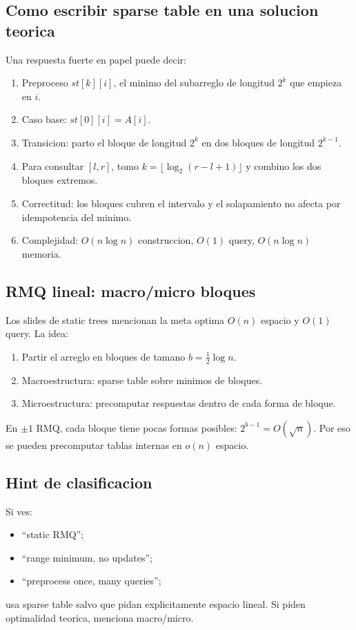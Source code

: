 \documentclass[10pt]{article}
\newcommand{\bigO}{O}
\begin{document}
\subsection{Como escribir sparse table en una solucion teorica}
Una respuesta fuerte en papel puede decir:
\begin{enumerate}[leftmargin=*]
\item Preproceso $st[k][i]$, el minimo del subarreglo de longitud $2^k$ que
empieza en $i$.
\item Caso base: $st[0][i]=A[i]$.
\item Transicion: parto el bloque de longitud $2^k$ en dos bloques de longitud
$2^{k-1}$.
\item Para consultar $[l,r]$, tomo $k=\lfloor\log_2(r-l+1)\rfloor$ y combino
los dos bloques extremos.
\item Correctitud: los bloques cubren el intervalo y el solapamiento no afecta
por idempotencia del minimo.
\item Complejidad: $\bigO(n\log n)$ construccion, $\bigO(1)$ query,
$\bigO(n\log n)$ memoria.
\end{enumerate}

\subsection{RMQ lineal: macro/micro bloques}
Los slides de static trees mencionan la meta optima $\bigO(n)$ espacio y
$\bigO(1)$ query. La idea:
\begin{enumerate}[leftmargin=*]
\item Partir el arreglo en bloques de tamano $b=\frac12\log n$.
\item Macroestructura: sparse table sobre minimos de bloques.
\item Microestructura: precomputar respuestas dentro de cada forma de bloque.
\end{enumerate}
En $\pm 1$ RMQ, cada bloque tiene pocas formas posibles: $2^{b-1}=O(\sqrt n)$.
Por eso se pueden precomputar tablas internas en $o(n)$ espacio.

\subsection{Hint de clasificacion}
Si ves:
\begin{itemize}[leftmargin=*]
\item ``static RMQ'';
\item ``range minimum, no updates'';
\item ``preprocess once, many queries'';
\end{itemize}
usa sparse table salvo que pidan explicitamente espacio lineal. Si piden
optimalidad teorica, menciona macro/micro.
\end{document}

